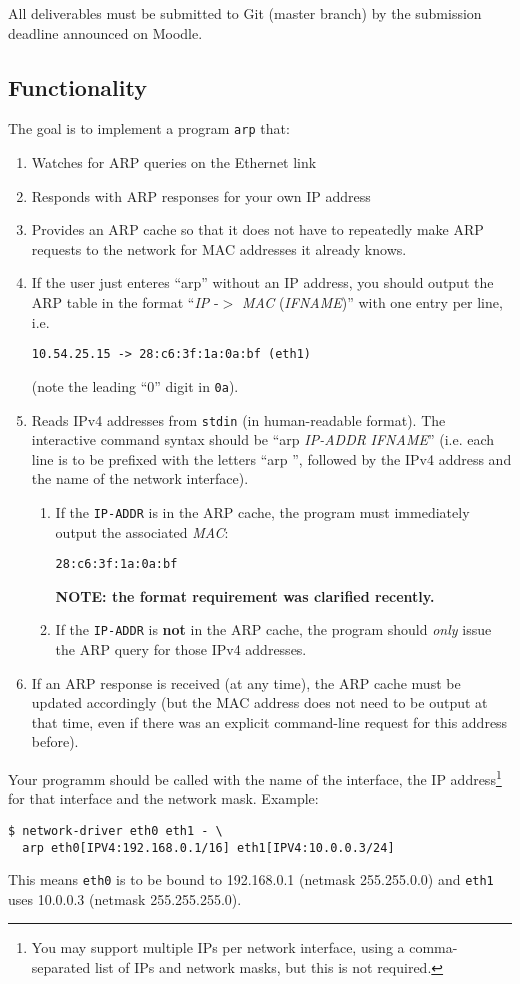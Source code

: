 \documentclass{article}
\begin{document}
All deliverables must be submitted to Git (master branch)
by the submission deadline announced on Moodle.

\subsection{Functionality}

The goal is to implement a program {\tt arp} that:
\begin{enumerate}
\item Watches for ARP queries on the Ethernet link
\item Responds with ARP responses for your own IP address
\item Provides an ARP cache so that it does not have to repeatedly
  make ARP requests to the network for MAC addresses it already knows.
\item If the user just enteres ``arp'' without
  an IP address, you should output the ARP table in the format
  ``{\em IP} -$>$ {\em MAC} ({\em IFNAME})'' with one entry per line,
  i.e.
\begin{verbatim}
10.54.25.15 -> 28:c6:3f:1a:0a:bf (eth1)
\end{verbatim}
  (note the leading ``0'' digit in {\tt 0a}).
\item Reads IPv4 addresses from {\tt stdin} (in human-readable format).
  The interactive command syntax should be
  ``arp {\em IP-ADDR} {\em IFNAME}'' (i.e. each line is to be prefixed with
  the letters ``arp '', followed by the IPv4 address and the name of
  the network interface).
  \begin{enumerate}
  \item
  If the {\tt IP-ADDR} is in the ARP cache, the program must immediately
  output the associated {\em MAC}:
  \begin{verbatim}
28:c6:3f:1a:0a:bf
\end{verbatim}
  {\bf NOTE: the format requirement was clarified recently.}
  \item
  If the {\tt IP-ADDR} is {\bf not} in the ARP cache, the program should {\em only}
  issue the ARP query for those IPv4 addresses.
  \end{enumerate}
\item If an ARP response is received (at any time), the ARP cache must be
  updated accordingly (but the MAC address does not need to be output at
  that time, even if there was an explicit command-line request for this
  address before).
\end{enumerate}
Your programm should be called with the name of the interface, the IP
address\footnote{You may support multiple IPs per network interface,
  using a comma-separated list of IPs and network masks, but this is
  not required.} for that interface and the network mask.  Example:
\begin{verbatim}
$ network-driver eth0 eth1 - \
  arp eth0[IPV4:192.168.0.1/16] eth1[IPV4:10.0.0.3/24]
\end{verbatim}
This means {\tt eth0} is to be bound to 192.168.0.1 (netmask 255.255.0.0)
and {\tt eth1} uses 10.0.0.3 (netmask 255.255.255.0).
\end{document}
